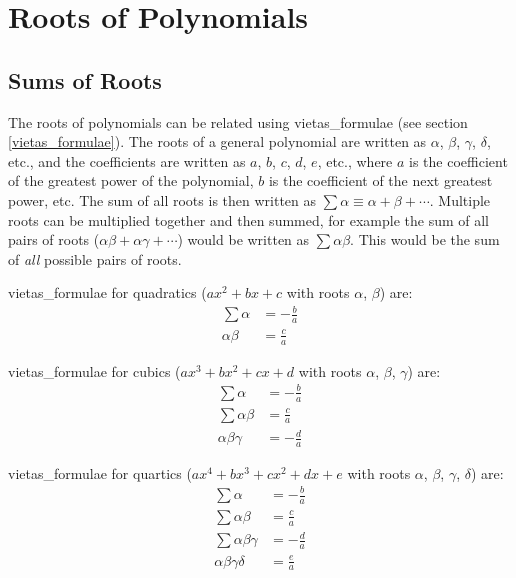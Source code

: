 \section{Roots of Polynomials} \label{roots_of_polynomials}
    \subsection{Sums of Roots}
        The \glspl{root} of \glspl{polynomial} can be related using \gls{vietas_formulae} (see section \ref{vietas_formulae}).
        The \glspl{root} of a general \gls{polynomial} are written as $\alpha$, $\beta$, $\gamma$, $\delta$, etc., and the coefficients are written as $a$, $b$, $c$, $d$, $e$, etc., where $a$ is the coefficient of the greatest power of the \gls{polynomial}, $b$ is the coefficient of the next greatest power, etc.
        The sum of all \glspl{root} is then written as $\sum\alpha\equiv\alpha+\beta+\cdots$.
        Multiple \glspl{root} can be multiplied together and then summed, for example the sum of all pairs of \glspl{root} ($\alpha\beta+\alpha\gamma+\cdots$) would be written as $\sum\alpha\beta$.
        This would be the sum of \textit{all} possible pairs of \glspl{root}.

        \Gls{vietas_formulae} for \glspl{quadratic} ($ax^2+bx+c$ with \glspl{root} $\alpha$, $\beta$) are:
        \begin{align}
            \sum\alpha&=-\frac{b}{a} \\
            \alpha\beta&=\frac{c}{a}
        \end{align}

        \Gls{vietas_formulae} for \glspl{cubic} ($ax^3+bx^2+cx+d$ with \glspl{root} $\alpha$, $\beta$, $\gamma$) are:
        \begin{align}
            \sum\alpha&=-\frac{b}{a} \\
            \sum\alpha\beta&=\frac{c}{a} \\
            \alpha\beta\gamma&=-\frac{d}{a}
        \end{align}

        \Gls{vietas_formulae} for \glspl{quartic} ($ax^4+bx^3+cx^2+dx+e$ with \glspl{root} $\alpha$, $\beta$, $\gamma$, $\delta$) are:
        \begin{align}
            \sum\alpha&=-\frac{b}{a} \\
            \sum\alpha\beta&=\frac{c}{a} \\
            \sum\alpha\beta\gamma&=-\frac{d}{a} \\
            \alpha\beta\gamma\delta&=\frac{e}{a}
        \end{align}
        
